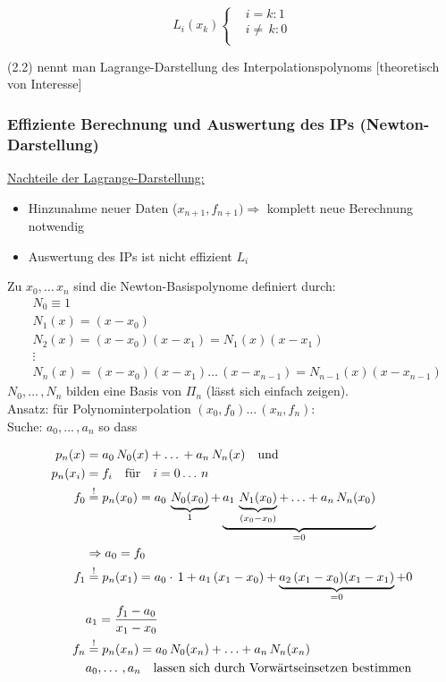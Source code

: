 \begin{equation*} 
  L_i(x_k)
	\left\{  
  \begin{aligned} 
   & i=k: 1 \\ 
   & i\neq\,k: 0\\
  \end{aligned} 
	\right.
\end{equation*} 

(2.2) nennt man Lagrange-Darstellung des Interpolationspolynoms [theoretisch von Interesse]

\subsubsection{Effiziente Berechnung und Auswertung des IPs (Newton-Darstellung)}
\underline{Nachteile der Lagrange-Darstellung:}

\begin{itemize}
	\item Hinzunahme neuer Daten ($x_{n+1},f_{n+1}) \Rightarrow$ komplett neue Berechnung notwendig
	\item Auswertung des IPs ist nicht effizient $L_i$
\end{itemize}

Zu $x_0,\ldots\,x_n$ sind die Newton-Basispolynome definiert durch:\\

\begin{align*}
&N_0 \equiv 1\\
&N_1(x) = (x-x_0)\\
&N_2(x) = (x-x_0)(x-x_1)=N_1(x)(x-x_1)\\
&\vdots \\
&N_n(x) = (x-x_0)(x-x_1)\ldots\,(x-x_{n-1})=N_{n-1}(x)(x-x_{n-1})
\end{align*}
$N_0,\ldots\,,N_n$ bilden eine Basis von $\Pi_n$ (lässt sich einfach zeigen).\\
Ansatz: für Polynominterpolation $(x_0,f_0)\ldots\,(x_n,f_n)$:\\
Suche: $a_0,\ldots\,,a_n$ so dass 

\begin{align*}
p_n(x)&=a_0\,N_0(x) + \ldots\, + a_n\,N_n(x) \quad \text{und} \\
p_n(x_i)&= f_i \quad \text{für} \quad i=0\ldots\,n \\
f_0 &\overset{!}{=} p_n(x_0) = a_0\,\underbrace{N_0(x_0)}_{1} + \underbrace{a_1\,\underbrace{N_1(x_0)}_{(x_0-x_0)} + \ldots + a_n\,N_n(x_0)}_{=0} \\
& \Rightarrow a_0 = f_0 \\
f_1 &\overset{!}{=} p_n(x_1) = a_0\cdot\,1 + a_1\,(x_1-x_0) + \underbrace{a_2\,(x_1-x_0)(x_1-x_1)}_{=0} + 0  \\
& a_1 = \frac{f_1-a_0}{x_1-x_0}\\
f_n &\overset{!}{=} p_n(x_n) = a_0\,N_0(x_n) + \ldots + a_n\,N_n(x_n) \\
& a_0,\ldots\,,a_n \quad \text{lassen sich durch Vorwärtseinsetzen bestimmen}
\end{align*}\\

